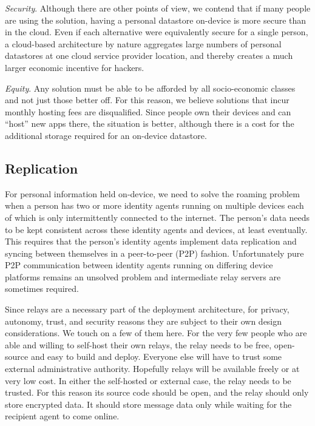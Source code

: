\documentclass[11pt, oneside]{article}   	%
\begin{document}
\emph{Security}. Although there are other points of view, we contend that if many people are using the solution, having a personal datastore on-device is more secure than in the cloud. Even if each alternative were equivalently secure for a single person, a cloud-based architecture by nature aggregates large numbers of personal datastores at one cloud service provider location, and thereby creates a much larger economic incentive for hackers. 

\emph{Equity}. Any solution must be able to be afforded by all socio-economic classes and not just those better off. For this reason, we believe solutions that incur monthly hosting fees are disqualified. Since people own their devices and can ``host'' new apps there, the situation is better, although there is a cost for the additional storage required for an on-device datastore.

\subsection{Replication}

For personal information held on-device, we need to solve the roaming problem when a person has two or more identity agents running on multiple devices each of which is only intermittently connected to the internet. The person's data needs to be kept consistent across these identity agents and devices, at least eventually. This requires that the person's identity agents implement data replication and syncing between themselves in a peer-to-peer (P2P) fashion. Unfortunately pure P2P communication between identity agents running on differing device platforms remains an unsolved problem and intermediate relay servers are sometimes required. 

Since relays are a necessary part of the deployment architecture, for privacy, autonomy, trust, and security reasons they are subject to their own design considerations. We touch on a few of them here. For the very few people who are able and willing to self-host their own relays, the relay needs to be free, open-source and easy to build and deploy. Everyone else will have to trust some external administrative authority. Hopefully relays will be available freely or at very low cost. In either the self-hosted or external case, the relay needs to be trusted. For this reason its source code should be open, and the relay should only store encrypted data. It should store message data only while waiting for the recipient agent to come online.
\end{document}
